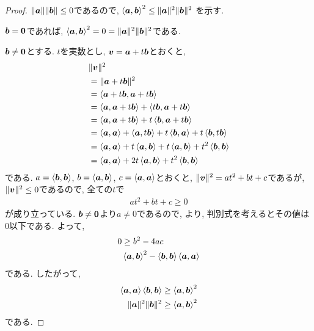 \begin{proof}
  $\|\aaa\|\|\bbb\|\leq 0$であるので,
  $\Braket{\aaa,\bbb}^2\leq \|\aaa\|^2\|\bbb\|^2$
  を示す.

  $\bbb=\zzero$であれば,  $\Braket{\aaa,\bbb}^2=0=\|\aaa\|^2\|\bbb\|^2$である.

  $\bbb\neq \zzero$とする.
  $t$を実数とし,
  $\vv=\aaa+t\bbb$とおくと,
  \begin{align*}
    &\|\vv\|^2\\
    &=\|\aaa+t\bbb\|^2\\
    &=\Braket{\aaa+t\bbb,\aaa+t\bbb}\\
    &=\Braket{\aaa,\aaa+t\bbb}+\Braket{t\bbb,\aaa+t\bbb}\\
    &=\Braket{\aaa,\aaa+t\bbb}+t\Braket{\bbb,\aaa+t\bbb}\\
    &=\Braket{\aaa,\aaa}+\Braket{\aaa,t\bbb}+t\Braket{\bbb,\aaa}+t\Braket{\bbb,t\bbb}\\
    &=\Braket{\aaa,\aaa}+t\Braket{\aaa,\bbb}+t\Braket{\aaa,\bbb}+t^2\Braket{\bbb,\bbb}\\
    &=\Braket{\aaa,\aaa}+2t\Braket{\aaa,\bbb}+t^2\Braket{\bbb,\bbb}
  \end{align*}
  である.
  $a=\Braket{\bbb,\bbb}$,
  $b=\Braket{\aaa,\bbb}$, 
  $c=\Braket{\aaa,\aaa}$とおくと,
  $\|\vv\|^2=at^2+bt+c$であるが,
  $\|\vv\|^2\leq 0$であるので,
  全ての$t$で
  \begin{align*}
    at^2+bt+c \geq 0
  \end{align*}
  が成り立っている.
  $\bbb\neq\zzero$より$a\neq 0$であるので,
  より,
  判別式を考えるとその値は$0$以下である.
  よって,
  \begin{align*}
    0&\geq b^2-4ac\\
    &\Braket{\aaa,\bbb}^2-\Braket{\bbb,\bbb}\Braket{\aaa,\aaa}
  \end{align*}
  である. したがって,
  \begin{align*}
    \Braket{\aaa,\aaa}\Braket{\bbb,\bbb}&\geq\Braket{\aaa,\bbb}^2\\
    \|\aaa\|^2\|\bbb\|^2&\geq\Braket{\aaa,\bbb}^2
  \end{align*}
  である.
\end{proof}

